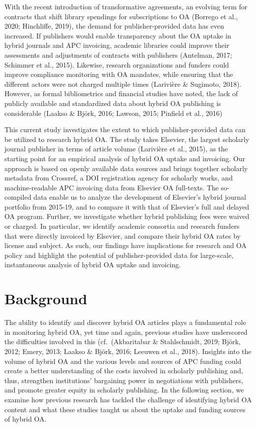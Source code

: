 \documentclass[a4paper,man,floatsintext,longtable,noextraspace,12pt]{apa6}
\begin{document}
With the recent introduction of transformative agreements, an evolving
term for contracts that shift library spendings for subscriptions to OA
(Borrego et al., 2020; Hinchliffe, 2019), the demand for
publisher-provided data has even increased. If publishers would enable
transparency about the OA uptake in hybrid journals and APC invoicing,
academic libraries could improve their assessments and adjustments of
contracts with publishers (Antelman, 2017; Schimmer et al., 2015).
Likewise, research organizations and funders could improve compliance
monitoring with OA mandates, while ensuring that the different actors
were not charged multiple times (Larivière \& Sugimoto, 2018). However,
as formal bibliometrics and financial studies have noted, the lack of
publicly available and standardized data about hybrid OA publishing is
considerable (Laakso \& Björk, 2016; Lawson, 2015; Pinfield et al.,
2016)

This current study investigates the extent to which publisher-provided
data can be utilized to research hybrid OA. The study takes Elsevier,
the largest scholarly journal publisher in terms of article volume
(Larivière et al., 2015), as the starting point for an empirical
analysis of hybrid OA uptake and invoicing. Our approach is based on
openly available data sources and brings together scholarly metadata
from Crossref, a DOI registration agency for scholarly works, and
machine-readable APC invoicing data from Elsevier OA full-texts. The
so-compiled data enable us to analyze the development of Elsevier's
hybrid journal portfolio from 2015-19, and to compare it with that of
Elsevier's full and delayed OA program. Further, we investigate whether
hybrid publishing fees were waived or charged. In particular, we
identify academic consortia and research funders that were directly
invoiced by Elsevier, and compare their hybrid OA rates by license and
subject. As such, our findings have implications for research and OA
policy and highlight the potential of publisher-provided data for
large-scale, instantaneous analysis of hybrid OA uptake and invoicing.

\hypertarget{background}{%
\section{Background}\label{background}}

The ability to identify and discover hybrid OA articles plays a
fundamental role in monitoring hybrid OA, yet time and again, previous
studies have underscored the difficulties involved in this
(cf.~(Akbaritabar \& Stahlschmidt, 2019; Björk, 2012; Emery, 2013;
Laakso \& Björk, 2016; Leeuwen et al., 2018). Insights into the volume
of hybrid OA and the various levels and sources of APC funding could
create a better understanding of the costs involved in scholarly
publishing and, thus, strengthen institutions' bargaining power in
negotiations with publishers, and promote greater equity in scholarly
publishing. In the following section, we examine how previous research
has tackled the challenge of identifying hybrid OA content and what
these studies taught us about the uptake and funding sources of hybrid
OA.
\end{document}
